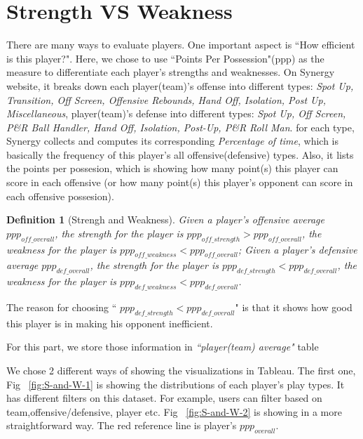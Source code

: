 \documentclass[conference]{IEEEtran}
\newtheorem{definition}{Definition}
\begin{document}
\section{Strength VS Weakness}
There are many ways to evaluate players. One important aspect is ``How efficient is this player?". Here, we chose to use ``Points Per Possession"(ppp) as the measure to differentiate each player's strengths and weaknesses. On Synergy website, it breaks down each player(team)'s offense into different types:\textit{ Spot Up, Transition, Off Screen, Offensive Rebounds, Hand Off, Isolation, Post Up, Miscellaneous}, player(team)'s defense into different types:\textit{ Spot Up, Off Screen, P\&R Ball Handler, Hand Off, Isolation, Post-Up, P\&R Roll Man}. for each type, Synergy collects and computes its corresponding \textit{Percentage of time}, which is basically the frequency of this player's all offensive(defensive) types. Also, it lists the points per possesion, which is showing how many point(s) this player can score in each offensive (or how many point(s) this player's opponent can score in each offensive possesion). 

\begin{definition}[Strengh and Weakness]
Given a player's offensive average $ppp_{off\_overall}$, the strength for the player is $ppp_{off\_strength}>ppp_{off\_overall}$, the weakness for the player is $ppp_{off\_weakness}<ppp_{off\_overall}$; Given a player's defensive average $ppp_{def\_overall}$, the strength for the player is $ppp_{def\_strength} < ppp_{def\_overall}$, the weakness for the player is $ppp_{def\_weakness}<ppp_{def\_overall}$.
\end{definition}

The reason for choosing `` $ppp_{def\_strength} < ppp_{def\_overall}$" is that it shows how good this player is in making his opponent inefficient.

For this part, we store those information in \textit{``player(team) average"} table

We chose 2 different ways of showing the visualizations in Tableau. The first one, Fig ~\ref{fig:S-and-W-1} is showing the distributions of each player's play types. It has different filters on this dataset. For example, users can filter based on team,offensive/defensive, player etc. Fig ~\ref{fig:S-and-W-2} is showing in a more straightforward way. The red reference line is player's $ppp_{overall}$.
\end{document}
